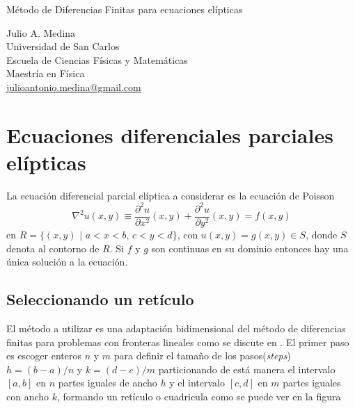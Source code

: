 \documentclass[a4paper]{article}
\begin{document}

\Large
 \begin{center}
Método de Diferencias Finitas para ecuaciones elípticas\\


\hspace{10pt}

\large
Julio A. Medina\\
\hspace{10pt}
\small  
Universidad de San Carlos\\
Escuela de Ciencias Físicas y Matemáticas\\
Maestría en Física\\
\href{mailto:julioantonio.medina@gmail.com}{julioantonio.medina@gmail.com}\\

\end{center}

\hspace{10pt}

\normalsize
\section{Ecuaciones diferenciales parciales elípticas}
La ecuación diferencial parcial elíptica a considerar es la ecuación de Poisson
\begin{equation}\label{eq::Poisson}
\nabla^2 u(x,y)\equiv \frac{\partial^2 u}{\partial x^2}(x,y) + \frac{\partial^2 u}{\partial y^2}(x,y)=f(x,y)
\end{equation}
en $R=\{ (x,y)\,\,|\,\, a<x<b ,\, c<y<d \}$, con $u(x,y)=g(x,y) \in S$, donde $S$ denota al contorno de $R$. Si $f$ y $g$ son continuas en su dominio entonces hay una única solución a la ecuación.
\subsection{Seleccionando un retículo}
El método a utilizar es una adaptación bidimensional del método de diferencias finitas para problemas con fronteras lineales como se discute en \cite{Burden}. El primer paso es escoger enteros $n$ y $m$ para definir el tamaño de los pasos(\textit{steps}) $h=(b-a)/n$ y $k=(d-c)/m$ particionando de está manera el intervalo $[a,b]$ en $n$ partes iguales de ancho $h$ y el intervalo $[c,d]$ en $m$ partes iguales con ancho $k$, formando un retículo o cuadricula como se puede ver en la figura
\end{document}
